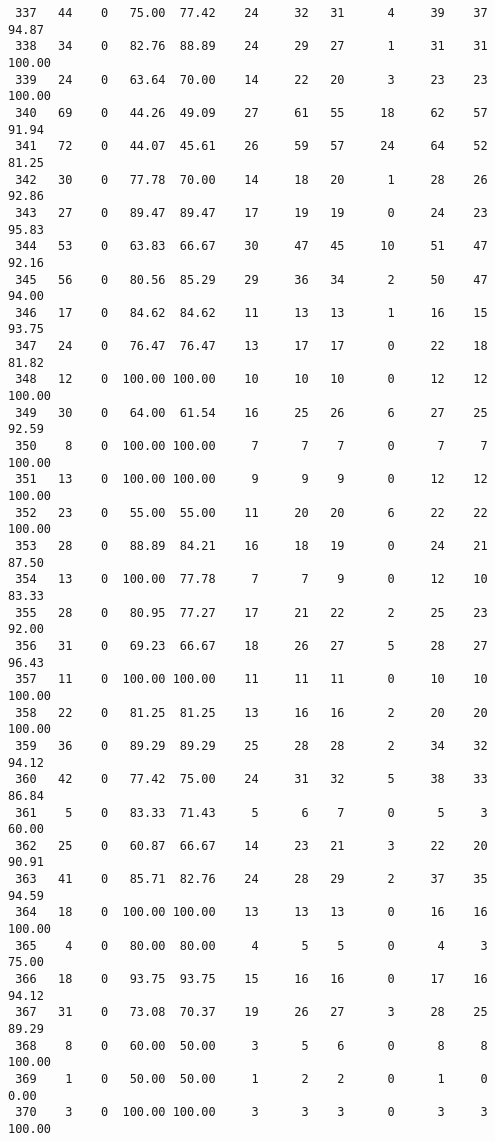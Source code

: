 \begin{verbatim}
 337   44    0   75.00  77.42    24     32   31      4     39    37    94.87
 338   34    0   82.76  88.89    24     29   27      1     31    31   100.00
 339   24    0   63.64  70.00    14     22   20      3     23    23   100.00
 340   69    0   44.26  49.09    27     61   55     18     62    57    91.94
 341   72    0   44.07  45.61    26     59   57     24     64    52    81.25
 342   30    0   77.78  70.00    14     18   20      1     28    26    92.86
 343   27    0   89.47  89.47    17     19   19      0     24    23    95.83
 344   53    0   63.83  66.67    30     47   45     10     51    47    92.16
 345   56    0   80.56  85.29    29     36   34      2     50    47    94.00
 346   17    0   84.62  84.62    11     13   13      1     16    15    93.75
 347   24    0   76.47  76.47    13     17   17      0     22    18    81.82
 348   12    0  100.00 100.00    10     10   10      0     12    12   100.00
 349   30    0   64.00  61.54    16     25   26      6     27    25    92.59
 350    8    0  100.00 100.00     7      7    7      0      7     7   100.00
 351   13    0  100.00 100.00     9      9    9      0     12    12   100.00
 352   23    0   55.00  55.00    11     20   20      6     22    22   100.00
 353   28    0   88.89  84.21    16     18   19      0     24    21    87.50
 354   13    0  100.00  77.78     7      7    9      0     12    10    83.33
 355   28    0   80.95  77.27    17     21   22      2     25    23    92.00
 356   31    0   69.23  66.67    18     26   27      5     28    27    96.43
 357   11    0  100.00 100.00    11     11   11      0     10    10   100.00
 358   22    0   81.25  81.25    13     16   16      2     20    20   100.00
 359   36    0   89.29  89.29    25     28   28      2     34    32    94.12
 360   42    0   77.42  75.00    24     31   32      5     38    33    86.84
 361    5    0   83.33  71.43     5      6    7      0      5     3    60.00
 362   25    0   60.87  66.67    14     23   21      3     22    20    90.91
 363   41    0   85.71  82.76    24     28   29      2     37    35    94.59
 364   18    0  100.00 100.00    13     13   13      0     16    16   100.00
 365    4    0   80.00  80.00     4      5    5      0      4     3    75.00
 366   18    0   93.75  93.75    15     16   16      0     17    16    94.12
 367   31    0   73.08  70.37    19     26   27      3     28    25    89.29
 368    8    0   60.00  50.00     3      5    6      0      8     8   100.00
 369    1    0   50.00  50.00     1      2    2      0      1     0     0.00
 370    3    0  100.00 100.00     3      3    3      0      3     3   100.00

\end{verbatim}

